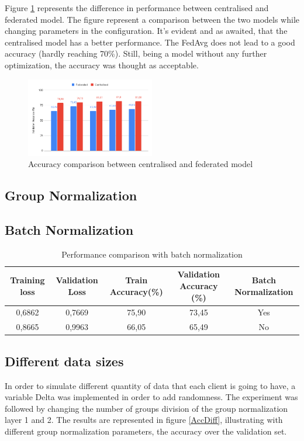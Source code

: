 \documentclass[twocolumn]{article}
\begin{document}
Figure \ref{AccCompFedCent} represents the difference in performance between centralised and federated model. The figure represent a comparison between the two models while changing parameters in the configuration. It's evident and as awaited, that the centralised model has a better performance. The FedAvg does not lead to a good accuracy (hardly reaching 70\%). Still, being a model without any further optimization, the accuracy was thought as acceptable.


\begin{figure}
    \centering
    \includegraphics[width=0.5\textwidth,height=.3\textheight]{FedAccuracyComp.png}
    \caption{Accuracy comparison between centralised and federated model}
     \label{AccCompFedCent} 
\end{figure}
\subsection{Group Normalization}
\subsection{Batch Normalization}


\begin{table}
\centering
\begin{tabular*}{\textwidth}{||c c c c c||} 
  \toprule
 Training loss & Validation Loss & Train Accuracy(\%) & Validation Accuracy (\%) & Batch Normalization \\
  \midrule
  0,6862 & 0,7669 & 75,90 & 73,45 & Yes \\
 \hline
 0,8665 & 0,9963 & 66,05 & 65,49 & No\\
  \bottomrule                             
\end{tabular*}
\label{batchNormComp}
\caption{Performance comparison with batch normalization}
\end{table}


\subsection{Different data sizes}
In order to simulate different quantity of data that each client is going to have, a variable Delta was implemented in order to add randomness. The experiment was followed by changing the number of groups division of the group normalization layer 1 and 2. The results are represented in figure \ref{AccDiff}, illustrating with different group normalization parameters, the accuracy over the validation set. 
\end{document}
